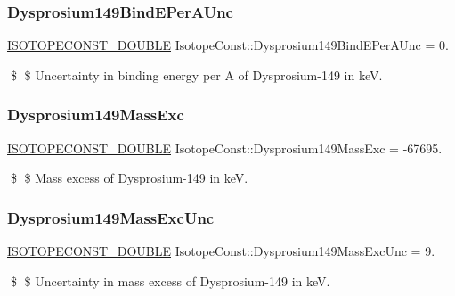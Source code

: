 \subsubsection{\texorpdfstring{Dysprosium149\+Bind\+E\+Per\+A\+Unc}{Dysprosium149BindEPerAUnc}}
{\footnotesize\ttfamily \mbox{\hyperlink{group___isotope_const-_macros_ga8f45a7272ce02c0b4c65c44636ed719a}{I\+S\+O\+T\+O\+P\+E\+C\+O\+N\+S\+T\+\_\+\+D\+O\+U\+B\+LE}} Isotope\+Const\+::\+Dysprosium149\+Bind\+E\+Per\+A\+Unc = 0.}

\$ \$ Uncertainty in binding energy per A of Dysprosium-\/149 in keV. \mbox{\label{group___isotope_const-_dysprosium-_dy149_ga21e04d64efbff95585c06367f9c4878e}} 
\subsubsection{\texorpdfstring{Dysprosium149\+Mass\+Exc}{Dysprosium149MassExc}}
{\footnotesize\ttfamily \mbox{\hyperlink{group___isotope_const-_macros_ga8f45a7272ce02c0b4c65c44636ed719a}{I\+S\+O\+T\+O\+P\+E\+C\+O\+N\+S\+T\+\_\+\+D\+O\+U\+B\+LE}} Isotope\+Const\+::\+Dysprosium149\+Mass\+Exc = -\/67695.}

\$ \$ Mass excess of Dysprosium-\/149 in keV. \mbox{\label{group___isotope_const-_dysprosium-_dy149_ga9831bafc9f423e450a27ce45b196e791}} 
\subsubsection{\texorpdfstring{Dysprosium149\+Mass\+Exc\+Unc}{Dysprosium149MassExcUnc}}
{\footnotesize\ttfamily \mbox{\hyperlink{group___isotope_const-_macros_ga8f45a7272ce02c0b4c65c44636ed719a}{I\+S\+O\+T\+O\+P\+E\+C\+O\+N\+S\+T\+\_\+\+D\+O\+U\+B\+LE}} Isotope\+Const\+::\+Dysprosium149\+Mass\+Exc\+Unc = 9.}

\$ \$ Uncertainty in mass excess of Dysprosium-\/149 in keV. \mbox{\label{group___isotope_const-_dysprosium-_dy149_ga02dd388369cdf8f9f0492ce259b15af9}} 
